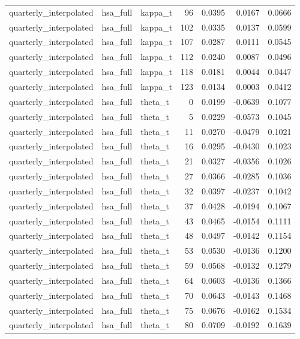 \begin{tabular}{lllrrrr}
quarterly\_interpolated & hsa\_full & kappa\_t & 96 & 0.0395 & 0.0167 & 0.0666 \\
quarterly\_interpolated & hsa\_full & kappa\_t & 102 & 0.0335 & 0.0137 & 0.0599 \\
quarterly\_interpolated & hsa\_full & kappa\_t & 107 & 0.0287 & 0.0111 & 0.0545 \\
quarterly\_interpolated & hsa\_full & kappa\_t & 112 & 0.0240 & 0.0087 & 0.0496 \\
quarterly\_interpolated & hsa\_full & kappa\_t & 118 & 0.0181 & 0.0044 & 0.0447 \\
quarterly\_interpolated & hsa\_full & kappa\_t & 123 & 0.0134 & 0.0003 & 0.0412 \\
quarterly\_interpolated & hsa\_full & theta\_t & 0 & 0.0199 & -0.0639 & 0.1077 \\
quarterly\_interpolated & hsa\_full & theta\_t & 5 & 0.0229 & -0.0573 & 0.1045 \\
quarterly\_interpolated & hsa\_full & theta\_t & 11 & 0.0270 & -0.0479 & 0.1021 \\
quarterly\_interpolated & hsa\_full & theta\_t & 16 & 0.0295 & -0.0430 & 0.1023 \\
quarterly\_interpolated & hsa\_full & theta\_t & 21 & 0.0327 & -0.0356 & 0.1026 \\
quarterly\_interpolated & hsa\_full & theta\_t & 27 & 0.0366 & -0.0285 & 0.1036 \\
quarterly\_interpolated & hsa\_full & theta\_t & 32 & 0.0397 & -0.0237 & 0.1042 \\
quarterly\_interpolated & hsa\_full & theta\_t & 37 & 0.0428 & -0.0194 & 0.1067 \\
quarterly\_interpolated & hsa\_full & theta\_t & 43 & 0.0465 & -0.0154 & 0.1111 \\
quarterly\_interpolated & hsa\_full & theta\_t & 48 & 0.0497 & -0.0142 & 0.1154 \\
quarterly\_interpolated & hsa\_full & theta\_t & 53 & 0.0530 & -0.0136 & 0.1200 \\
quarterly\_interpolated & hsa\_full & theta\_t & 59 & 0.0568 & -0.0132 & 0.1279 \\
quarterly\_interpolated & hsa\_full & theta\_t & 64 & 0.0603 & -0.0136 & 0.1366 \\
quarterly\_interpolated & hsa\_full & theta\_t & 70 & 0.0643 & -0.0143 & 0.1468 \\
quarterly\_interpolated & hsa\_full & theta\_t & 75 & 0.0676 & -0.0162 & 0.1534 \\
quarterly\_interpolated & hsa\_full & theta\_t & 80 & 0.0709 & -0.0192 & 0.1639 \\

\end{tabular}
